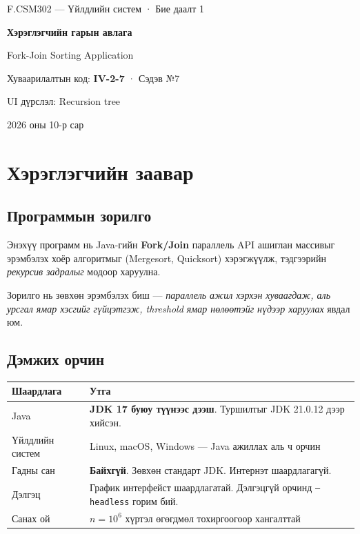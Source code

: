 \documentclass[11pt,a4paper]{article}
\begin{document}
\begin{titlepage}
\centering
\vspace*{2.5cm}
{\large F.CSM302 --- Үйлдлийн систем · Бие даалт 1\par}
\vspace{1.4cm}
{\Huge\bfseries\color{accent} Хэрэглэгчийн гарын авлага\par}
\vspace{0.5cm}
{\Large Fork-Join Sorting Application\par}
\vspace{0.3cm}
{\large Хуваарилалтын код: \textbf{IV-2-7} · Сэдэв №7\par}
{\large UI дүрслэл: Recursion tree\par}
\vfill
{\large 2026 оны 10-р сар}
\vspace{2cm}
\end{titlepage}

\tableofcontents
\newpage

\section{Хэрэглэгчийн заавар}

\subsection{Программын зорилго}
Энэхүү программ нь Java-гийн \textbf{Fork/Join} параллель API ашиглан массивыг
эрэмбэлэх хоёр алгоритмыг (Mergesort, Quicksort) хэрэгжүүлж, тэдгээрийн
\emph{рекурсив задралыг} модоор харуулна.

Зорилго нь зөвхөн эрэмбэлэх биш --- \emph{параллель ажил хэрхэн хуваагдаж,
аль урсгал ямар хэсгийг гүйцэтгэж, threshold ямар нөлөөтэйг нүдээр харуулах}
явдал юм.

\subsection{Дэмжих орчин}
\begin{center}
\small
\begin{tabular}{lL{10.5cm}}
\toprule
Шаардлага & Утга \\
\midrule
Java & \textbf{JDK 17 буюу түүнээс дээш}. Туршилтыг JDK 21.0.12 дээр хийсэн. \\
Үйлдлийн систем & Linux, macOS, Windows --- Java ажиллах аль ч орчин \\
Гадны сан & \textbf{Байхгүй}. Зөвхөн стандарт JDK. Интернэт шаардлагагүй. \\
Дэлгэц & График интерфейст шаардлагатай. Дэлгэцгүй орчинд \texttt{--headless}
горим бий. \\
Санах ой & $n = 10^6$ хүртэл өгөгдмөл тохиргоогоор хангалттай \\
\bottomrule
\end{tabular}
\end{center}
\end{document}
